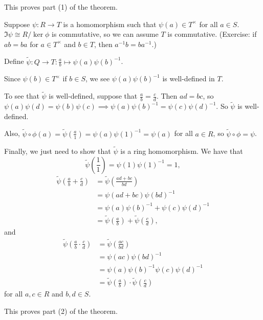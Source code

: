 \documentclass[12pt,letterpaper]{report}
\begin{document}
\begin{thmproof}
  This proves part (1) of the theorem.

  Suppose $\psi \colon R \to T$ is a homomorphism such that $\psi(a) \in T^\times$ for all
  $a \in S$.
  $\Im\psi \cong R/\ker\phi$ is commutative, so we can assume $T$ is commutative.
  (Exercise: if $ab = ba$ for $a \in T^\times$ and $b \in T$, then $a^{-1}b = ba^{-1}$.)

  \begin{tcolorbox}
    Define $\tilde{\psi} \colon Q \to T : \frac{a}{b} \mapsto \psi(a)\psi(b)^{-1}$.
  \end{tcolorbox}

  Since $\psi(b) \in T^\times$ if $b \in S$, we see $\psi(a)\psi(b)^{-1}$ is well-defined in $T$.

  To see that $\tilde{\psi}$ is well-defined, suppose that $\frac{a}{b} = \frac{c}{d}$.
  Then $ad = bc$, so $\psi(a)\psi(d) = \psi(b)\psi(c) \implies
    \psi(a)\psi(b)^{-1} = \psi(c)\psi(d)^{-1}$.
  So $\tilde{\psi}$ is well-defined.

  Also, $\tilde{\psi} \circ \phi(a) = \tilde{\psi}\left(\frac{a}{1}\right) = \psi(a)\psi(1)^{-1}
    = \psi(a)$ for all $a \in R$, so $\tilde{\psi} \circ \phi = \psi$.

  Finally, we just need to show that $\tilde{\psi}$ is a ring homomorphism.
  We have that
  \[
    \tilde{\psi}\left(\frac{1}{1}\right) = \psi(1)\psi(1)^{-1} = 1,
  \]
  \begin{align*}
    \tilde{\psi}\left(\frac{a}{b} + \frac{c}{d}\right)
    &= \tilde{\psi}\left(\frac{ad + bc}{bd}\right) \\
    &= \psi(ad + bc)\psi(bd)^{-1} \\
    &= \psi(a)\psi(b)^{-1} + \psi(c)\psi(d)^{-1} \\
    &= \tilde{\psi}\left(\frac{a}{b}\right) + \tilde{\psi}\left(\frac{c}{d}\right),
  \end{align*}
  and
  \begin{align*}
    \tilde{\psi}\left(\frac{a}{b} \cdot \frac{c}{d}\right)
    &= \tilde{\psi}\left(\frac{ac}{bd}\right) \\
    &= \psi(ac)\psi(bd)^{-1} \\
    &= \psi(a)\psi(b)^{-1}\psi(c)\psi(d)^{-1} \\
    &= \tilde{\psi}\left(\frac{a}{b}\right) \cdot \tilde{\psi}\left(\frac{c}{d}\right)
  \end{align*}
  for all $a, c \in R$ and $b, d \in S$.

  This proves part (2) of the theorem.
\end{thmproof}
\end{document}
